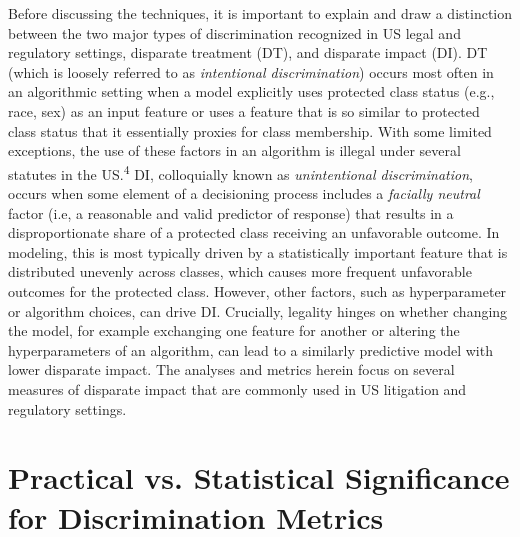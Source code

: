 \documentclass[information,article,submit,moreauthors,pdftex]{definitions/mdpi}
\begin{document}
Before discussing the techniques, it is important to explain and draw a distinction between the two major types of discrimination recognized in US legal and regulatory settings, disparate treatment (DT), and disparate impact (DI). DT (which is loosely referred to as \textit{intentional discrimination}) occurs most often in an algorithmic setting when a model explicitly uses protected class status (e.g., race, sex) as an input feature or uses a feature that is so similar to protected class status that it essentially proxies for class membership.  With some limited exceptions, the use of these factors in an algorithm is illegal under several statutes in the US.\textsuperscript{4} DI, colloquially known as \textit{unintentional discrimination}, occurs when some element of a decisioning process includes a \textit{facially neutral} factor (i.e, a reasonable and valid predictor of response) that results in a disproportionate share of a protected class receiving an unfavorable outcome.  In modeling, this is most typically driven by a statistically important feature that is distributed unevenly across classes, which causes more frequent unfavorable outcomes for the protected class.  However, other factors, such as hyperparameter or algorithm choices, can drive DI.  Crucially, legality hinges on whether changing the model, for example exchanging one feature for another or altering the hyperparameters of an algorithm, can lead to a similarly predictive model with lower disparate impact. The analyses and metrics herein focus on several measures of disparate impact that are commonly used in US litigation and regulatory settings.

\section{Practical vs. Statistical Significance for Discrimination Metrics}\label{a_sec:prac_v_stat}
\end{document}
